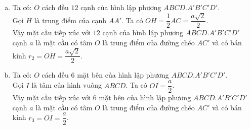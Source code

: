 \begin{vd}
{\begin{enumerate}[a)]
	\item Ta có: $O$ cách đều $12$ cạnh của hình lập phương $ABCD.A'B'C'D'$.\\
			Gọi $H$ là trung điểm của cạnh $AA'$. Ta có $OH = \dfrac{1}{2}AC = \dfrac{a\sqrt{2}}{2}$.\\
			Vậy mặt cầu tiếp xúc với $12$ cạnh của hình lập phương $ABCD.A'B'C'D'$ cạnh $a$ là mặt cầu có tâm $O$ là trung điểm của đường chéo $AC'$ và có bán kính $r_2 = OH = \dfrac{a\sqrt{2}}{2}$.
	\item Ta có: $O$ cách đều $6$ mặt bên của hình lập phương $ABCD.A'B'C'D'$.\\
			Gọi $I$ là tâm của hình vuông $ABCD$. Ta có $OI = \dfrac{a}{2}$.\\
			Vậy mặt cầu tiếp xúc với $6$ mặt bên của hình lập phương $ABCD.A'B'C'D'$ cạnh $a$ là mặt cầu có tâm $O$ là trung điểm của đường chéo $AC'$ và có bán kính $r_3 = OI = \dfrac{a}{2}$.
\end{enumerate}
}
\end{vd}

